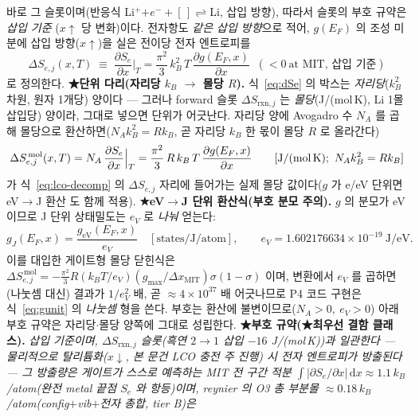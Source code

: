 \documentclass[11pt,a4paper]{article}
\newcommand{\dd}{\mathrm{d}}
\newcommand{\rxn}{\mathrm{rxn}}
\begin{document}
바로 그 슬롯이며(반응식 Li$^+$$+e^-+[\,]\rightleftharpoons$Li, 삽입 방향), 따라서 슬롯의 부호 규약은 \emph{삽입 기준}
($x\!\uparrow$ 당 변화)이다. 전자항도 \emph{같은 삽입 방향}으로 적어, $g(E_F)$ 의 조성 미분에 삽입 방향($x\!\uparrow$)을
실은 전이당 전자 엔트로피를
\begin{equation}
\boxed{\;\Delta S_{e,j}(x,T)\;\equiv\;\frac{\partial S_e}{\partial x}\Big|_T
=\frac{\pi^2}{3}\,k_B^2\,T\,\frac{\partial g(E_F,x)}{\partial x}\;\;(<0\ \text{at MIT, 삽입 기준})\;}
\label{eq:dSe}
\end{equation}
로 정의한다. \textbf{★단위 다리(자리당 $k_B$ $\to$ 몰당 $R$).} 식~\eqref{eq:dSe} 의 박스는 \emph{자리당}($k_B^2$ 차원,
원자 1개당) 양이다 — 그러나 forward 슬롯 $\Delta S_{\rxn,j}$ 는 \emph{몰당}(J/(mol\,K), Li 1몰 삽입당) 양이라, 그대로
넣으면 단위가 어긋난다. 자리당 양에 Avogadro 수 $N_A$ 를 곱해 몰당으로 환산하면($N_A k_B^2=R k_B$, 곧 자리당 $k_B$ 한 몫이
몰당 $R$ 로 올라간다)
\begin{equation}
\Delta S_{e,j}^{\,\mathrm{mol}}(x,T)=N_A\,\frac{\partial S_e}{\partial x}\Big|_T
=\frac{\pi^2}{3}\,R\,k_B\,T\,\frac{\partial g(E_F,x)}{\partial x}
\qquad[\text{J/(mol\,K)};\ N_A k_B^2=R k_B]
\label{eq:dSemolar}
\end{equation}
가 식~\eqref{eq:lco-decomp} 의 $\Delta S_{e,j}$ 자리에 들어가는 실제 몰당 값이다($g$ 가 e/eV 단위면 eV$\to$J 환산
도 함께 적용). \textbf{★eV$\to$J 단위 환산식(부호 분모 주의).} $g$ 의 분모가 eV 이므로 J 단위 상태밀도는 $e_V$ 로
\emph{나눠} 얻는다:
\begin{equation}
g_J(E_F,x)=\frac{g_{\mathrm{eV}}(E_F,x)}{e_V}\quad[\text{states/J/atom}],
\qquad e_V=1.602176634\times10^{-19}\ \text{J/eV}.
\label{eq:gunit}
\end{equation}
이를 대입한 게이트형 몰당 닫힌식은 $\Delta S_{e,j}^{\,\mathrm{mol}}=-\tfrac{\pi^2}{3}R(k_BT/e_V)(g_{\max}/\Delta x_\mathrm{MIT})
\sigma(1-\sigma)$ 이며, 변환에서 $e_V$ 를 곱하면(나눗셈 대신) 결과가 $1/e_V^2$ 배, 곧 $\approx4\times10^{37}$ 배 어긋나므로
P4 코드 구현은 식~\eqref{eq:gunit} 의 \emph{나눗셈} 형을 쓴다. 부호는 환산에 불변이므로($N_A>0,\ e_V>0$) 아래 부호
규약은 자리당$\cdot$몰당 양쪽에 그대로 성립한다. \textbf{★부호 규약(★최우선 결함 클래스).} \emph{삽입 기준이며, $\Delta S_{\rxn,j}$ 슬롯(흑연 $2\!\to\!1$
삽입 $-16$ J/(mol\,K))과 일관한다 — 물리적으로 탈리튬화($x\!\downarrow$, 본 문건 LCO 충전 주 진행) 시 전자
엔트로피가 방출된다 — 그 방출량은 게이트가 스스로 예측하는 MIT 전 구간 적분 $\int|\partial S_e/\partial x|\,\dd x\approx1.1\,k_B$/atom(완전 metal 끝점
$S_e$ 와 항등)이며, reynier\cite{reynier2004} 의 O3 총 부분몰 $\approx0.18\,k_B$/atom(config$+$vib$+$전자 총합, tier B)은
}$$
\end{document}
